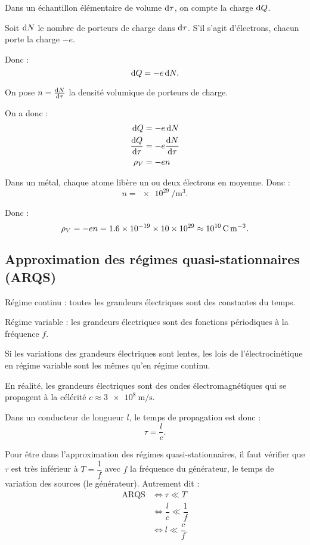 Dans un échantillon élémentaire de volume \(\odif{\tau}\), on compte la charge \(\odif{Q}\).

Soit \(\odif{N}\) le nombre de porteurs de charge dans \(\odif{\tau}\). S'il s'agit d'électrons, chacun porte la charge \(-e\).

Donc : \[\odif{Q}=-e\odif{N}.\]

On pose \(n=\odv{N}{\tau}\) la densité volumique de porteurs de charge.

On a donc : \[\begin{aligned}
\odif{Q}&=-e\odif{N} \\
\odv{Q}{\tau}&=-e\odv{N}{\tau} \\
\rho_V&=-en
\end{aligned}\]

Dans un métal, chaque atome libère un ou deux électrons en moyenne. Donc : \[n=\SI{e29}{\per\metre\cubed}.\]

Donc : \[\rho_V=-en=\numproduct{1.6e-19x10e29}\approx\SI{e10}{\coulomb\per\meter\cubed}.\]

\subsection{Approximation des régimes quasi-stationnaires (ARQS)}

Régime continu : toutes les grandeurs électriques sont des constantes du temps.

Régime variable : les grandeurs électriques sont des fonctions périodiques à la fréquence \(f\).

Si les variations des grandeurs électriques sont lentes, les lois de l'électrocinétique en régime variable sont les mêmes qu'en régime continu.

En réalité, les grandeurs électriques sont des ondes électromagnétiques qui se propagent à la célérité \(c\approx\SI{3e8}{\metre\per\second}\).

Dans un conducteur de longueur \(l\), le temps de propagation est donc : \[\tau=\dfrac{l}{c}.\]

Pour être dans l'approximation des régimes quasi-stationnaires, il faut vérifier que \(\tau\) est très inférieur à \(T=\dfrac{1}{f}\) avec \(f\) la fréquence du générateur, le temps de variation des sources (\ie le générateur). Autrement dit : \[\begin{aligned}
\text{ARQS}&\iff\tau\ll T \\
&\iff\dfrac{l}{c}\ll\dfrac{1}{f} \\
&\iff l\ll\dfrac{c}{f}.
\end{aligned}\]

